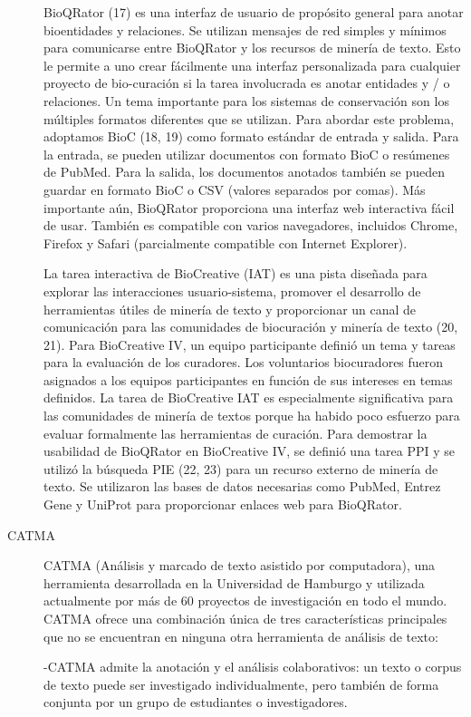 \begin{description}
BioQRator (17) es una interfaz de usuario de propósito general para anotar bioentidades y relaciones. Se utilizan mensajes de red simples y mínimos para comunicarse entre BioQRator y los recursos de minería de texto. Esto le permite a uno crear fácilmente una interfaz personalizada para cualquier proyecto de bio-curación si la tarea involucrada es anotar entidades y / o relaciones. Un tema importante para los sistemas de conservación son los múltiples formatos diferentes que se utilizan. Para abordar este problema, adoptamos BioC (18, 19) como formato estándar de entrada y salida. Para la entrada, se pueden utilizar documentos con formato BioC o resúmenes de PubMed. Para la salida, los documentos anotados también se pueden guardar en formato BioC o CSV (valores separados por comas). Más importante aún, BioQRator proporciona una interfaz web interactiva fácil de usar. También es compatible con varios navegadores, incluidos Chrome, Firefox y Safari (parcialmente compatible con Internet Explorer).

La tarea interactiva de BioCreative (IAT) es una pista diseñada para explorar las interacciones usuario-sistema, promover el desarrollo de herramientas útiles de minería de texto y proporcionar un canal de comunicación para las comunidades de biocuración y minería de texto (20, 21). Para BioCreative IV, un equipo participante definió un tema y tareas para la evaluación de los curadores. Los voluntarios biocuradores fueron asignados a los equipos participantes en función de sus intereses en temas definidos. La tarea de BioCreative IAT es especialmente significativa para las comunidades de minería de textos porque ha habido poco esfuerzo para evaluar formalmente las herramientas de curación. Para demostrar la usabilidad de BioQRator en BioCreative IV, se definió una tarea PPI y se utilizó la búsqueda PIE (22, 23) para un recurso externo de minería de texto. Se utilizaron las bases de datos necesarias como PubMed, Entrez Gene y UniProt para proporcionar enlaces web para BioQRator.

\item[CATMA]

CATMA (Análisis y marcado de texto asistido por computadora), una herramienta desarrollada en la Universidad de Hamburgo y utilizada actualmente por más de 60 proyectos de investigación en todo el mundo. CATMA ofrece una combinación única de tres características principales que no se encuentran en ninguna otra herramienta de análisis de texto:

-CATMA admite la anotación y el análisis colaborativos: un texto o corpus de texto puede ser investigado individualmente, pero también de forma conjunta por un grupo de estudiantes o investigadores.


\end{description}
